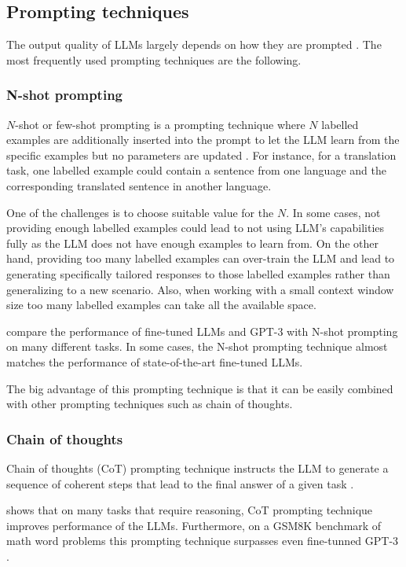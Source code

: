 \subsection{Prompting techniques}

The output quality of LLMs largely depends on how they are prompted \cite{Brown2020,Wei2022}. The most frequently used prompting techniques are the following.


\subsubsection{N-shot prompting}

$N$-shot or few-shot prompting is a prompting technique where $N$ labelled examples are additionally inserted into the prompt to let the LLM learn from the specific examples but no parameters are updated \cite{Brown2020}. For instance, for a translation task, one labelled example could contain a sentence from one language and the corresponding translated sentence in another language.

One of the challenges is to choose suitable value for the $N$. In some cases, not providing enough labelled examples could lead to not using LLM's capabilities fully as the LLM does not have enough examples to learn from. On the other hand, providing too many labelled examples can over-train the LLM and lead to generating specifically tailored responses to those labelled examples rather than generalizing to a new scenario. Also, when working with a small context window size too many labelled examples can take all the available space.

\citet{Brown2020} compare the performance of fine-tuned LLMs and GPT-3 with N-shot prompting on many different tasks. In some cases, the N-shot prompting technique almost matches the performance of state-of-the-art fine-tuned LLMs.

The big advantage of this prompting technique is that it can be easily combined with other prompting techniques such as chain of thoughts.


\subsubsection{Chain of thoughts}

Chain of thoughts (CoT) prompting technique instructs the LLM to generate a sequence of coherent steps that lead to the final answer of a given task \cite{Wei2022}.

\citet{Wei2022} shows that on many tasks that require reasoning, CoT prompting technique improves performance of the LLMs. Furthermore, on a GSM8K benchmark of math word problems this prompting technique surpasses even fine-tunned GPT-3 \cite{Wei2022}.

